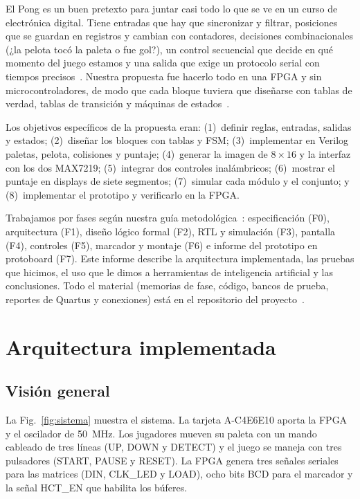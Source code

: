 \documentclass[conference,a4paper]{IEEEtran}
\begin{document}
El Pong es un buen pretexto para juntar casi todo lo que se ve en un curso de electrónica digital. Tiene entradas que hay que sincronizar y filtrar, posiciones que se guardan en registros y cambian con contadores, decisiones combinacionales (¿la pelota tocó la paleta o fue gol?), un control secuencial que decide en qué momento del juego estamos y una salida que exige un protocolo serial con tiempos precisos~\cite{mano,brown,tocci}. Nuestra propuesta fue hacerlo todo en una FPGA y sin microcontroladores, de modo que cada bloque tuviera que diseñarse con tablas de verdad, tablas de transición y máquinas de estados~\cite{propuesta}.

Los objetivos específicos de la propuesta eran: (1)~definir reglas, entradas, salidas y estados; (2)~diseñar los bloques con tablas y FSM; (3)~implementar en Verilog paletas, pelota, colisiones y puntaje; (4)~generar la imagen de $8\times16$ y la interfaz con los dos MAX7219; (5)~integrar dos controles inalámbricos; (6)~mostrar el puntaje en displays de siete segmentos; (7)~simular cada módulo y el conjunto; y (8)~implementar el prototipo y verificarlo en la FPGA.

Trabajamos por fases según nuestra guía metodológica~\cite{guia}: especificación (F0), arquitectura (F1), diseño lógico formal (F2), RTL y simulación (F3), pantalla (F4), controles (F5), marcador y montaje (F6) e informe del prototipo en protoboard (F7). Este informe describe la arquitectura implementada, las pruebas que hicimos, el uso que le dimos a herramientas de inteligencia artificial y las conclusiones. Todo el material (memorias de fase, código, bancos de prueba, reportes de Quartus y conexiones) está en el repositorio del proyecto~\cite{repo}.

\section{Arquitectura implementada}

\subsection{Visión general}

La Fig.~\ref{fig:sistema} muestra el sistema. La tarjeta A-C4E6E10 aporta la FPGA y el oscilador de 50~MHz. Los jugadores mueven su paleta con un mando cableado de tres líneas (UP, DOWN y DETECT) y el juego se maneja con tres pulsadores (START, PAUSE y RESET). La FPGA genera tres señales seriales para las matrices (DIN, CLK\_LED y LOAD), ocho bits BCD para el marcador y la señal HCT\_EN que habilita los búferes.
\end{document}
